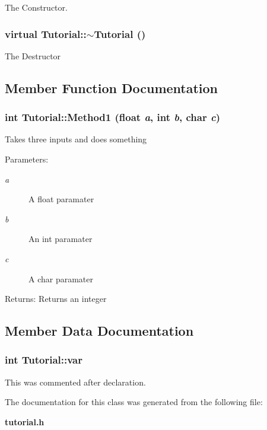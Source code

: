 The Constructor. 

\subsubsection{\setlength{\rightskip}{0pt plus 5cm}virtual Tutorial::$\sim$Tutorial ()\hspace{0.3cm}{\tt  [virtual]}}\label{classTutorial_2b8a6579a13d610952905cbad431c530}


The Destructor 

\subsection{Member Function Documentation}
\subsubsection{\setlength{\rightskip}{0pt plus 5cm}int Tutorial::Method1 (float {\em a}, int {\em b}, char {\em c})}\label{classTutorial_04817d0d5e6661df4cf8f2881f4fe8b0}


Takes three inputs and does something

\begin{Desc}
\item[Parameters:]
\begin{description}
\item[{\em a}]A float paramater \item[{\em b}]An int paramater \item[{\em c}]A char paramater \end{description}
\end{Desc}
\begin{Desc}
\item[Returns:]Returns an integer \end{Desc}


\subsection{Member Data Documentation}
\subsubsection{\setlength{\rightskip}{0pt plus 5cm}int \bf{Tutorial::var}}\label{classTutorial_67af307b5cf50033d52c71d9c7d44771}


This was commented after declaration. 



The documentation for this class was generated from the following file:\begin{CompactItemize}
\item 
\bf{tutorial.h}\end{CompactItemize}
